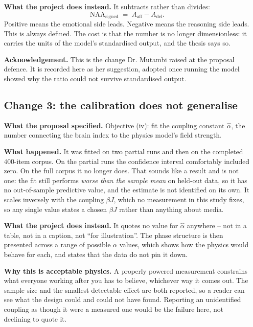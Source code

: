 \documentclass[11pt,a4paper]{article}
\newcommand{\naa}{\mathrm{NAA}}
\begin{document}
\textbf{What the project does instead.} It subtracts rather than divides:
\[
\naa_{\text{signed}} \;=\; A_{\text{aff}} - A_{\text{del}}.
\]
Positive means the emotional side leads. Negative means the reasoning side leads.
This is always defined. The cost is that the number is no longer dimensionless: it
carries the units of the model's standardised output, and the thesis says so.

\textbf{Acknowledgement.} This is the change Dr. Mutambi raised at the proposal
defence. It is recorded here as her suggestion, adopted once running the model
showed why the ratio could not survive standardised output.

\subsection{Change 3: the calibration does not generalise}

\textbf{What the proposal specified.} Objective (iv): fit the coupling constant
$\hat{\alpha}$, the number connecting the brain index to the physics model's field
strength.

\textbf{What happened.} It was fitted on two partial runs and then on the
completed 400-item corpus. On the partial runs the confidence interval comfortably
included zero. On the full corpus it no longer does. That sounds like a result and is
not one: the fit still performs \emph{worse than the sample mean} on held-out data, so
it has no out-of-sample predictive value, and the estimate is not identified on its own.
It scales inversely with the coupling $\beta J$, which no measurement in this study
fixes, so any single value states a chosen $\beta J$ rather than anything about media.

\textbf{What the project does instead.} It quotes no value for $\hat{\alpha}$ anywhere -- not in a table, not in a caption, not ``for
illustration''. The phase structure is then presented across a range of possible
$\alpha$ values, which shows how the physics would behave for each, and states that
the data do not pin it down.

\textbf{Why this is acceptable physics.} A properly powered measurement constrains what
everyone working after you has to believe, whichever way it comes out. The sample size
and the smallest detectable effect are both reported, so a reader can see what the
design could and could not have found. Reporting an unidentified coupling as though it
were a measured one would be the failure here, not declining to quote it.
\end{document}
